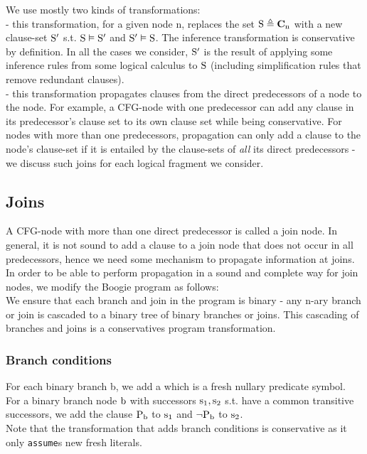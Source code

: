 We use mostly two kinds of transformations:\\
 - this transformation, for a given node n, replaces the set $\mathrm{S \triangleq \mathbf{C}_{\mathrm{n}}}$ with a new clause-set $\mathrm{S'}$ s.t. $\mathrm{S \vDash S'}$ and $\mathrm{S' \vDash S}$. The inference transformation is conservative by definition. 
In all the cases we consider, $\mathrm{S'}$ is the result of applying some inference rules from some logical calculus to $\mathrm{S}$ (including simplification rules that remove redundant clauses).\\
 - this transformation propagates clauses from the direct predecessors of a node to the node. 
For example, a CFG-node with one predecessor can add any clause in its predecessor's clause set to its own clause set while being conservative. For nodes with more than one predecessors, propagation can only add a clause to the node's clause-set if it is entailed by the clause-sets of \emph{all} its direct predecessors - we discuss such joins for each logical fragment we consider.

\subsection*{Joins}
A CFG-node with more than one direct predecessor is called a join node.
In general, it is not sound to add a clause to a join node that does not occur in all predecessors, hence we need some mechanism to propagate information at joins.
In order to be able to perform propagation in a sound and complete way for join nodes, we modify the Boogie program as follows:\\
We ensure that each branch and join in the program is binary - any n-ary branch or join is cascaded to a binary tree of binary branches or joins. This cascading of branches and joins is a conservatives program transformation.

\subsubsection*{Branch conditions}
For each binary branch b, we add a   which is a fresh nullary predicate symbol.\\
For a binary branch node $\mathrm{b}$ with successors $\mathrm{s_1,s_2}$ s.t.  have a common transitive successors, we add the clause $\mathrm{P_b}$ to $\mathrm{s_1}$ and $\mathrm{\lnot P_b}$ to $\mathrm{s_2}$.\\
Note that the transformation that adds branch conditions is conservative as it only \lstinline|assume|s new fresh literals.


